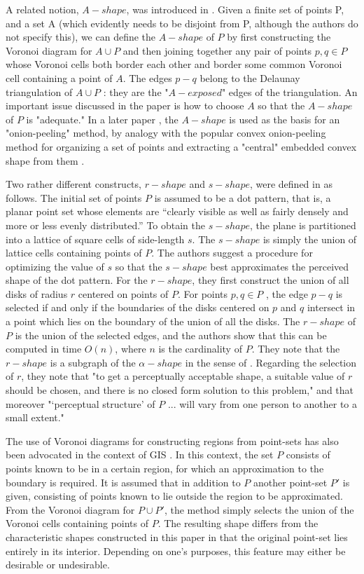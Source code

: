 \documentclass[preprint,5p,times,twocolumn]{elsarticle}
\begin{document}
A related notion, $A-shape$, was introduced in \cite{Melkemi:7693802}. Given a finite set of points P, and a set A (which evidently needs to be disjoint from P, although the authors do not specify this), we can define the $A-shape$ of $P$ by first constructing the Voronoi diagram for $A \cup P$ and then joining together any pair of points $p, q \in P$ whose Voronoi cells both border each other and border some common Voronoi cell containing a point of $A$. The edges $p-q$ belong to the Delaunay triangulation of $A \cup P$ : they are the "$A-exposed$" edges of the triangulation. An important
issue discussed in the paper is how to choose $A$ so that the $A-shape$ of $P$ is "adequate." In a later paper \cite{fadili:hal-01123869}, the $A-shape$ is used as the basis for an "onion-peeling" method, by analogy with the popular convex onion-peeling method for organizing a set of points and extracting a "central" embedded convex shape from them \cite{Chazelle1057060}.


Two rather different constructs, $r-shape$ and $s-shape$, were defined in \cite{Chaudhuri:1997:NAC:269777.269779} as follows. The initial set of points $P$ is assumed to be a dot pattern, that is, a planar point set whose elements are “clearly visible as well as fairly densely and more or less evenly distributed.” To obtain the $s-shape$, the plane is partitioned into a lattice of square cells of side-length $s$. The $s-shape$ is simply the union of lattice cells containing points of $P$. The authors suggest a procedure for optimizing the value of $s$ so that the $s-shape$ best approximates the perceived shape of the dot pattern. For the $r-shape$, they first construct the union of all disks of radius $r$ centered on points of $P$. For points $p, q \in P$ , the edge $p-q$ is selected if and only if the boundaries of the disks centered on $p$ and $q$ intersect in a point which lies on the boundary of the union of all the disks. The $r-shape$ of $P$ is the union of the selected edges, and the authors show that this can be computed in time $O(n)$, where $n$ is the cardinality of $P$. They note that the $r-shape$ is a subgraph of the $\alpha-shape$ in the sense of \cite{Edelsbrunner:2006:SSP:2263365.2270180}. Regarding the selection of $r$, they note that "to get a perceptually acceptable shape, a suitable value of $r$ should be chosen, and there is no closed form solution to this problem," and that moreover "‘perceptual structure’ of $P$ ... will vary from one person to another to a small extent."

The use of Voronoi diagrams for constructing regions from point-sets has also been advocated in the context of GIS \cite{Harith01}. In this context, the set $P$ consists of points known to be in a certain region, for which an approximation to the boundary is required. It is assumed that in addition to $P$ another point-set $P'$ is given, consisting of points known to lie outside the region to be approximated. From the Voronoi diagram for $P \cup P'$, the method simply selects the union of the Voronoi cells containing points of $P$. The resulting shape differs from the characteristic shapes constructed in this paper in that the original point-set lies entirely in its interior. Depending on one’s purposes,
this feature may either be desirable or undesirable. 
\end{document}
